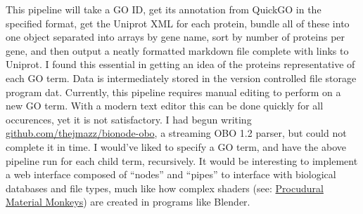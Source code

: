 This pipeline will take a GO ID, get its annotation from QuickGO in the
specified format, get the Uniprot XML for each protein, bundle all of these into
one object separated into arrays by gene name, sort by number of proteins per
gene, and then output a neatly formatted markdown file complete with links to
Uniprot. I found this essential in getting an idea of the proteins
representative of each GO term. Data is intermediately stored in the version
controlled file storage program dat. Currently, this pipeline requires manual
editing to perform on a new GO term. With a modern text editor this can be done
quickly for all occurences, yet it is not satisfactory. I had begun writing
\href{https://github.com/thejmazz/bionode-obo}{github.com/thejmazz/bionode-obo},
a streaming OBO 1.2 parser, but could not complete it in time. I would've liked
to specify a GO term, and have the above pipeline run for each child term,
recursively. It would be interesting to implement a web interface composed of
``nodes'' and ``pipes'' to interface with biological databases and file types,
much like how complex shaders (see: \href{http://imgur.com/a/CQUIL}{Procudural
Material Monkeys}) are created in programs like Blender.





